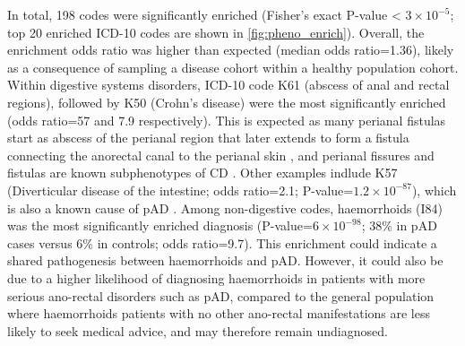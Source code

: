 In total, 198 codes were significantly enriched (Fisher's exact  P-value < $3\times10^{-5}$; top 20 enriched ICD-10 codes are shown in \ref{fig:pheno_enrich}). Overall, the enrichment odds ratio was higher than expected (median odds ratio=1.36), likely as a consequence of sampling a disease cohort within a healthy population cohort. Within digestive systems disorders, ICD-10 code K61 (abscess of anal and rectal regions), followed by K50 (Crohn's disease) were the most significantly enriched (odds ratio=57 and 7.9 respectively). This is expected as many perianal fistulas start as abscess of the perianal region that later extends to form a fistula connecting the anorectal canal to the perianal skin \cite{abscess_fist}, and perianal fissures and fistulas are known subphenotypes of CD \cite{Marzo2015-wf}. Other examples indlude K57 (Diverticular disease of the intestine; odds ratio=2.1; P-value=$1.2\times10^{-87}$), which is also a known cause of pAD \cite{div_pad}. Among non-digestive codes, haemorrhoids (I84) was the most significantly enriched diagnosis (P-value=$6\times10^{-98}$; 38\% in pAD cases versus 6\% in controls; odds ratio=9.7). This enrichment could indicate a shared pathogenesis between haemorrhoids and pAD. However, it could also be due to a higher likelihood of diagnosing haemorrhoids in patients with more serious ano-rectal disorders such as pAD, compared to the general population where haemorrhoids patients with no other ano-rectal manifestations are less likely to seek medical advice, and may therefore remain undiagnosed. \\




